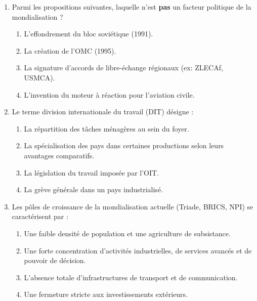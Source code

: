 \documentclass[11pt]{article}
\begin{document}
\begin{exercice}
\begin{enumerate}
    \item Parmi les propositions suivantes, laquelle n'est \textbf{pas} un facteur politique de la mondialisation ?
    \begin{enumerate}
        \item L'effondrement du bloc soviétique (1991).
        \item La création de l'OMC (1995).
        \item La signature d'accords de libre-échange régionaux (ex: ZLECAf, USMCA).
        \item L'invention du moteur à réaction pour l'aviation civile.
    \end{enumerate}
    \item Le terme \og division internationale du travail \fg{} (DIT) désigne :
    \begin{enumerate}
        \item La répartition des tâches ménagères au sein du foyer.
        \item La spécialisation des pays dans certaines productions selon leurs avantages comparatifs.
        \item La législation du travail imposée par l'OIT.
        \item La grève générale dans un pays industrialisé.
    \end{enumerate}
    \item Les \og pôles de croissance \fg{} de la mondialisation actuelle (Triade, BRICS, NPI) se caractérisent par :
    \begin{enumerate}
        \item Une faible densité de population et une agriculture de subsistance.
        \item Une forte concentration d'activités industrielles, de services avancés et de pouvoir de décision.
        \item L'absence totale d'infrastructures de transport et de communication.
        \item Une fermeture stricte aux investissements extérieurs.
    \end{enumerate}
\end{enumerate}
\end{exercice}
\end{document}
